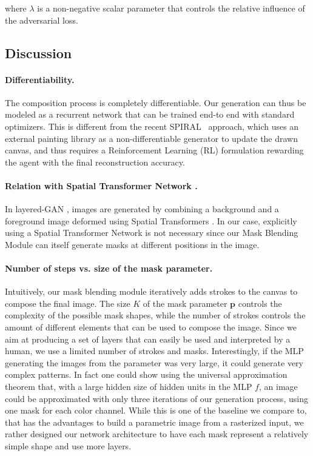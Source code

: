 \documentclass[10pt,twocolumn,letterpaper]{article}
\begin{document}
where $\lambda$ is a non-negative scalar parameter that controls the relative influence of the adversarial loss. 

\subsection{Discussion}
\paragraph{Differentiability.} The composition process is completely differentiable. 
Our generation can thus be modeled as a recurrent network that can be trained end-to end with standard optimizers. This is different from the recent SPIRAL~\cite{ganin2018synthesizing} approach, which uses an external painting library as a non-differentiable generator to update the drawn canvas, and thus requires a Reinforcement Learning (RL) formulation rewarding the agent with the final reconstruction accuracy.


\paragraph{Relation with Spatial Transformer Network \cite{Jaderberg2015STN}.}
In layered-GAN \cite{Yang2017LRGAN}, images are generated by combining a background and a foreground image deformed using Spatial Transformers \cite{Jaderberg2015STN}. In our case, explicitly using a Spatial Transformer Network is not necessary since our Mask Blending Module can itself generate masks at different positions in the image. %

\paragraph{Number of steps vs. size of the mask parameter.} Intuitively, our mask blending module iteratively adds strokes to the canvas to compose the final image. The size $K$ of the mask parameter $\mathbf{p}$ controls the complexity of the possible mask shapes, while the number of strokes controls the amount of different elements that can be used to compose the image. Since we aim at producing a set of layers that can easily be used and interpreted by a human, we use a limited number of strokes and masks. %
Interestingly, if the MLP generating the images from the parameter was very large, it could generate very complex patterns. In fact one could show using the universal approximation theorem \cite{cybenko1989approximation,hornik1991approximation} that, with a large hidden size of hidden units in the MLP $f$, an image could be approximated with only three iterations of our generation process, using one mask for each color channel. While this is one of the baseline we compare to, that has the advantages to build a parametric image from a rasterized input, we rather designed our network architecture to have each mask represent a relatively simple shape and use more layers.
\end{document}
